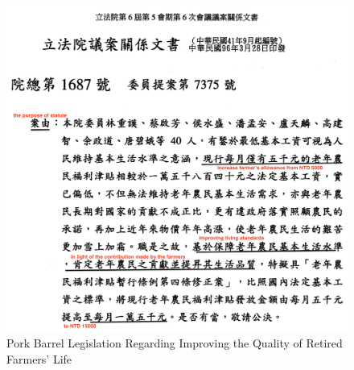 \begin{figure}[!ht]
    \centering
    \includegraphics[width = 14.5cm]{03-Chapter-Three/image/billeg.png}
    \caption{Pork Barrel Legislation Regarding Improving the Quality of Retired Farmers' Life}
    \label{fig:farmers}
    \begin{tablenotes}
    \end{tablenotes}
\end{figure}
